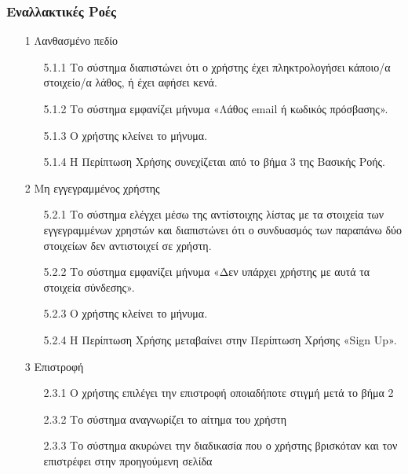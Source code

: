 \documentclass[12pt,a4paper,twoside]{book}
\begin{document}
\subsubsection{Εναλλακτικές Ροές}
\begin{enumerate}
  \item[1 ] Λανθασμένο πεδίο  %
        \begin{enumerate}
          \item[5.1.1 ] Το σύστημα διαπιστώνει ότι ο χρήστης έχει πληκτρολογήσει κάποιο/α στοιχείο/α λάθος, ή έχει αφήσει κενά. %
          \item[5.1.2 ] Το σύστημα εμφανίζει μήνυμα «Λάθος email ή κωδικός πρόσβασης». %
          \item[5.1.3 ] Ο χρήστης κλείνει το μήνυμα. %
          \item[5.1.4 ] Η Περίπτωση Χρήσης συνεχίζεται από το βήμα 3 της Βασικής Ροής. %
        \end{enumerate}
  \item[2 ] Μη εγγεγραμμένος χρήστης %
        \begin{enumerate}
          \item[5.2.1 ] Το σύστημα ελέγχει μέσω της αντίστοιχης λίστας με τα στοιχεία των εγγεγραμμένων χρηστών και διαπιστώνει ότι ο συνδυασμός των παραπάνω δύο στοιχείων δεν αντιστοιχεί σε χρήστη. %
          \item[5.2.2 ] Το σύστημα εμφανίζει μήνυμα «Δεν υπάρχει χρήστης με αυτά τα στοιχεία σύνδεσης». %
          \item[5.2.3 ] Ο χρήστης κλείνει το μήνυμα.%
          \item[5.2.4 ] Η Περίπτωση Χρήσης μεταβαίνει στην Περίπτωση Χρήσης «Sign Up». %
        \end{enumerate}
  \item[3 ] Επιστροφή
        \begin{enumerate}
          \item[2.3.1 ] Ο χρήστης επιλέγει την επιστροφή οποιαδήποτε στιγμή μετά το βήμα 2 %
          \item[2.3.2 ] Το σύστημα αναγνωρίζει το αίτημα του χρήστη %
          \item[2.3.3 ] Το σύστημα ακυρώνει την διαδικασία που ο χρήστης βρισκόταν και τον επιστρέφει στην προηγούμενη σελίδα %
        \end{enumerate}
\end{enumerate}
\end{document}
